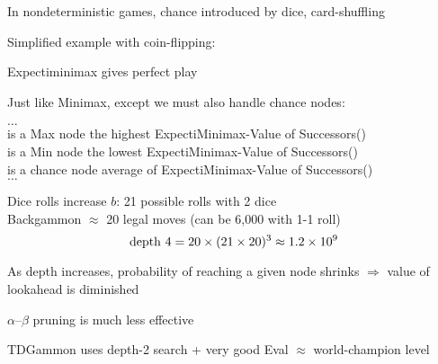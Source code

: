 \documentclass{article}
\begin{document}
\begin{huge}
\vspace*{0.3in}

\maxfigwidth
{}





In nondeterministic games, chance introduced by dice, card-shuffling

Simplified example with coin-flipping:

\vspace*{0.3in}

\textwidth
{}



{\sc Expectiminimax} gives perfect play

Just like {\sc Minimax}, except we must also handle chance nodes:

$\ldots$\\
  is a {\sc Max} node \nl
    the highest {\sc ExpectiMinimax-Value} of {\sc Successors}()\\
  is a {\sc Min} node \nl
    the lowest {\sc ExpectiMinimax-Value} of {\sc Successors}()\\
  is a chance node \nl
    average of {\sc ExpectiMinimax-Value} of {\sc Successors}()\\
$\ldots$


Dice rolls increase $b$: 21 possible rolls with 2 dice\\
Backgammon $\approx$ 20 legal moves (can be 6,000 with 1-1 roll)
\[
{\rm depth}\ 4 = 20 \times (21 \times 20)^3 \approx 1.2\times 10^9
\]

As depth increases, probability of reaching a given node shrinks\nl
$\Rightarrow$ value of lookahead is diminished

$\alpha$--$\beta$ pruning is much less effective

{\sc TDGammon} uses depth-2 search + very good {\sc Eval}\nl
$\approx$ world-champion level



\end{huge}
\end{document}
